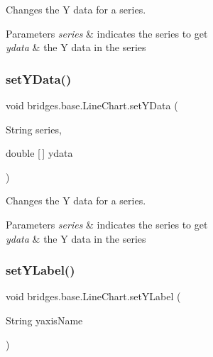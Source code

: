 Changes the Y data for a series. 


\begin{DoxyParams}{Parameters}
{\em series} & indicates the series to get \\
\hline
{\em ydata} & the Y data in the series \\
\hline
\end{DoxyParams}
\mbox{\label{classbridges_1_1base_1_1_line_chart_aa8094fad197ae35d93f9feab5de91f59}} 
\subsubsection{\texorpdfstring{setYData()}{setYData()}\hspace{0.1cm}{\footnotesize\ttfamily [2/2]}}
{\footnotesize\ttfamily void bridges.\+base.\+Line\+Chart.\+set\+Y\+Data (\begin{DoxyParamCaption}\item[{String}]{series,  }\item[{double \mbox{[}$\,$\mbox{]}}]{ydata }\end{DoxyParamCaption})}



Changes the Y data for a series. 


\begin{DoxyParams}{Parameters}
{\em series} & indicates the series to get \\
\hline
{\em ydata} & the Y data in the series \\
\hline
\end{DoxyParams}
\mbox{\label{classbridges_1_1base_1_1_line_chart_adddccbe77ebd2590f426fab9c8227457}} 
\subsubsection{\texorpdfstring{setYLabel()}{setYLabel()}}
{\footnotesize\ttfamily void bridges.\+base.\+Line\+Chart.\+set\+Y\+Label (\begin{DoxyParamCaption}\item[{String}]{yaxis\+Name }\end{DoxyParamCaption})}



